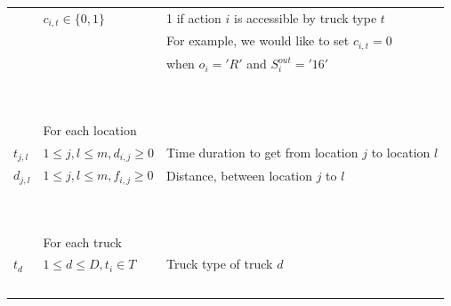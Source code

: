 \documentclass{article}
\begin{document}
\begin{tabular}{ l | l | l }
                               & $  c_{i,t} \in \{0, 1\}                                     $  & 1 if action $i$ is accessible by truck type $t$               \\
                               & $                                                           $  & For example, we would like to set $c_{i,t} = 0$               \\
                               & $                                                           $  & when $o_i = 'R'$ and $S^{out}_i = '16'$                       \\
                               & $                                                           $  &                                                               \\
                               & $                                                           $  &                                                               \\
                               & For each location                                              &                                                               \\
  $t_{j,l}$                    & $  1 \le j, l \le m, d_{i,j} \ge 0                          $  & Time duration to get from location $j$ to location $l$        \\
  $d_{j,l}$                    & $  1 \le j, l \le m, f_{i,j} \ge 0                          $  & Distance, between location $j$ to $l$ \\
                               & $                                                           $  &                                                               \\
                               & $                                                           $  &                                                               \\
                               & For each truck                                                 &                                                               \\
  $t_d$                        & $ 1 \le d \le D, t_i \in T                                  $  &  Truck type of truck $d$                                      \\
                               & $                                                           $  &                                                               \\

\end{tabular}
\end{document}
